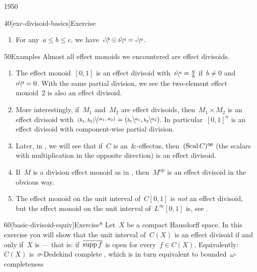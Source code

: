 \begin{parsec}{1950}
\begin{point}{40}[exc-divisoid-basics]{Exercise}
\begin{enumerate}
    $\rfrac{0}{0}=0$, $\rfrac{1}{1}=1$, $\rfrac{a}{1}=a$, $\rfrac{a}{a} \odot \rfrac{a}{a} = \rfrac{a}{a}$ and
    $\rfrac{a \odot b}{a} = \rfrac{a}{a }\odot b$.
\item
    For any~$a \leq b \leq c$,
    we have~$\rfrac{b}{c} \odot \rfrac{a}{b} = \rfrac{a}{c}$.
\end{enumerate}
\spacingfix{}
\end{point}
\begin{point}{50}{Examples}%
Almost all effect monoids we encountered
    are effect divisoids.
\begin{enumerate}
\item
The effect monoid~$[0,1]$
    is an effect divisoid with~$\rfrac{a}{b} = \frac{a}{b}$
        if~$b \neq 0$ and~$\rfrac{0}{0}=0$.
With the same partial division, we see the two-element effect monoid~$2$
    is also an effect divisoid.
\item
More interestingly,
    if~$M_1$ and~$M_2$
    are effect divisoids,
    then~$M_1 \times M_2$
    is an effect divisoid
    with~$\rfrac{(a_1,a_2)}{(b_1,b_2)} =
    (\rfrac{a_1}{b_1}, \rfrac{a_2}{b_2})$.
In particular~$[0,1]^n$ is an effect divisoid
    with component-wise partial division.
\item
Later, in ,
    we will see that if~$C$ is an~$\&$-effectus,
then~$(\operatorname{Scal} C)^{\mathsf{op}}$ (the scalars with multiplication in the
    opposite direction)
    is an effect divisoid.
\item
If~$M$ is a division effect monoid as in \cite[dfn.~6.3]{kentapartial},
then~$M^{\textrm{op}}$ is an effect divisoid in the obvious way.
\item
The effect monoid on the unit interval of~$C[0,1]$
    is \emph{not} an effect divisoid,
    but the effect monoid on the unit interval of~$L^\infty[0,1]$
    is, see .
\end{enumerate}
\spacingfix{}
\end{point}
\begin{point}{60}[basic-divisoid-equiv]{Exercise*}%
Let~$X$ be a compact Hausdorff space.
In this exercise you will show
    that the unit interval of~$C(X)$
    is an effect divisoid
    if and only if~$X$
    is 
    \cite[1H]{gillman2013rings}
    --- that is: if~$\overline{\operatorname{supp} f}$ is open
    for every~$f \in C(X)$.
Equivalently:
$C(X)$ is~$\sigma$-Dedekind complete
    \cite[3N.5]{gillman2013rings},
    which is in turn equivalent to bounded~$\omega$-completeness

\end{point}
\end{parsec}
